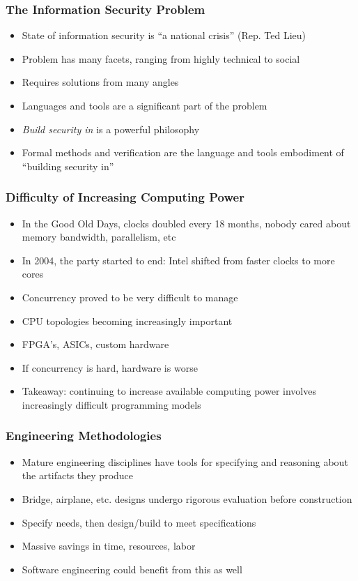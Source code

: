 \documentclass{beamer}
\begin{document}
\begin{frame}
  \frametitle{The Information Security Problem}
  \begin{itemize}
    \item State of information security is ``a national crisis'' (Rep. Ted Lieu)
    \item Problem has many facets, ranging from highly technical to social
    \item Requires solutions from many angles
    \item Languages and tools are a significant part of the problem
    \item \emph{Build security in} is a powerful philosophy
    \item Formal methods and verification are the language and tools
      embodiment of ``building security in''
  \end{itemize}
\end{frame}

\begin{frame}
  \frametitle{Difficulty of Increasing Computing Power}
  \begin{itemize}
    \item In the Good Old Days, clocks doubled every 18 months, nobody
      cared about memory bandwidth, parallelism, etc
    \item In 2004, the party started to end: Intel shifted from faster
      clocks to more cores
    \item Concurrency proved to be very difficult to manage
    \item CPU topologies becoming increasingly important
    \item FPGA's, ASICs, custom hardware
    \item If concurrency is hard, hardware is worse
    \item Takeaway: continuing to increase available computing power
      involves increasingly difficult programming models
  \end{itemize}
\end{frame}

\begin{frame}
  \frametitle{Engineering Methodologies}
  \begin{itemize}
    \item Mature engineering disciplines have tools for specifying and
      reasoning about the artifacts they produce
    \item Bridge, airplane, etc. designs undergo rigorous evaluation
      before construction
    \item Specify needs, then design/build to meet specifications
    \item Massive savings in time, resources, labor
    \item Software engineering could benefit from this as well
  \end{itemize}
\end{frame}
\end{document}
